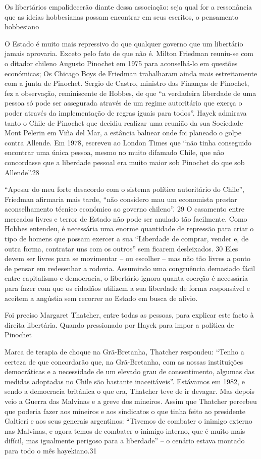 Os libertários empalidecerão diante dessa associação: seja qual for a ressonância que as ideias hobbesianas possam encontrar em seus escritos, o pensamento hobbesiano
 \par 
O Estado é muito mais repressivo do que qualquer governo que um libertário jamais aprovaria. Exceto pelo fato de que não é. Milton Friedman reuniu-se com o ditador chileno Augusto Pinochet em 1975 para aconselhá-lo em questões económicas; Os Chicago Boys de Friedman trabalharam ainda mais estreitamente com a junta de Pinochet. Sergio de Castro, ministro das Finanças de Pinochet, fez a observação, reminiscente de Hobbes, de que “a verdadeira liberdade de uma pessoa só pode ser assegurada através de um regime autoritário que exerça o poder através da implementação de regras iguais para todos”. Hayek admirava tanto o Chile de Pinochet que decidiu realizar uma reunião da sua Sociedade Mont Pelerin em Viña del Mar, a estância balnear onde foi planeado o golpe contra Allende. Em 1978, escreveu ao London Times que “não tinha conseguido encontrar uma única pessoa, mesmo no muito difamado Chile, que não concordasse que a liberdade pessoal era muito maior sob Pinochet do que sob Allende”.{\color{blue}28}
 \par 
“Apesar do meu forte desacordo com o sistema político autoritário do Chile”, Friedman afirmaria mais tarde, “não considero mau um economista prestar aconselhamento técnico económico ao governo chileno”. {\color{blue}29} O casamento entre mercados livres e terror de Estado não pode ser anulado tão facilmente. Como Hobbes entendeu, é necessária uma enorme quantidade de repressão para criar o tipo de homens que possam exercer a sua “Liberdade de comprar, vender e, de outra forma, contratar uns com os outros” sem ficarem desleixados. {\color{blue}30} Eles devem ser livres para se movimentar – ou escolher – mas não tão livres a ponto de pensar em redesenhar a rodovia. Assumindo uma congruência demasiado fácil entre capitalismo e democracia, o libertário ignora quanta coerção é necessária para fazer com que os cidadãos utilizem a sua liberdade de forma responsável e aceitem a angústia sem recorrer ao Estado em busca de alívio.
 \par 
Foi preciso Margaret Thatcher, entre todas as pessoas, para explicar este facto à direita libertária. Quando pressionado por Hayek para impor a política de Pinochet
 \par 
Marca de terapia de choque na Grã-Bretanha, Thatcher respondeu: “Tenho a certeza de que concordarão que, na Grã-Bretanha, com as nossas instituições democráticas e a necessidade de um elevado grau de consentimento, algumas das medidas adoptadas no Chile são bastante inaceitáveis”. Estávamos em 1982, e sendo a democracia britânica o que era, Thatcher teve de ir devagar. Mas depois veio a Guerra das Malvinas e a greve dos mineiros. Assim que Thatcher percebeu que poderia fazer aos mineiros e aos sindicatos o que tinha feito ao presidente Galtieri e aos seus generais argentinos: “Tivemos de combater o inimigo externo nas Malvinas, e agora temos de combater o inimigo interno, que é muito mais difícil, mas igualmente perigoso para a liberdade” – o cenário estava montado para todo o mês hayekiano.{\color{blue}31}
